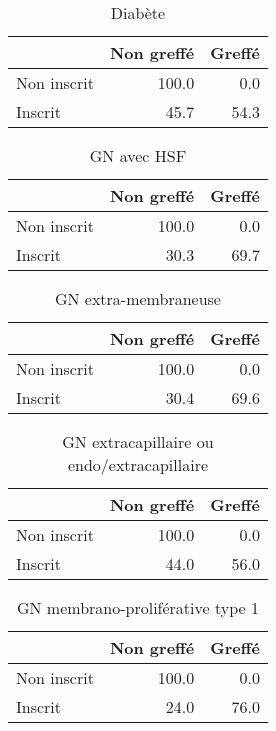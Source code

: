 \documentclass[11pt,a4paper]{article}\usepackage[]{graphicx}\usepackage[]{color}
\begin{document}
\begin{table}[H]
\centering
\begin{tabular}{lrr}
  \hline
 & Non greffé & Greffé \\ 
  \hline
Non inscrit & 100.0 & 0.0 \\ 
  Inscrit & 45.7 & 54.3 \\ 
   \hline
\end{tabular}
\caption{Diabète} 
\end{table}
\begin{table}[H]
\centering
\begin{tabular}{lrr}
  \hline
 & Non greffé & Greffé \\ 
  \hline
Non inscrit & 100.0 & 0.0 \\ 
  Inscrit & 30.3 & 69.7 \\ 
   \hline
\end{tabular}
\caption{GN avec HSF} 
\end{table}
\begin{table}[H]
\centering
\begin{tabular}{lrr}
  \hline
 & Non greffé & Greffé \\ 
  \hline
Non inscrit & 100.0 & 0.0 \\ 
  Inscrit & 30.4 & 69.6 \\ 
   \hline
\end{tabular}
\caption{GN extra-membraneuse} 
\end{table}
\begin{table}[H]
\centering
\begin{tabular}{lrr}
  \hline
 & Non greffé & Greffé \\ 
  \hline
Non inscrit & 100.0 & 0.0 \\ 
  Inscrit & 44.0 & 56.0 \\ 
   \hline
\end{tabular}
\caption{GN extracapillaire ou endo/extracapillaire} 
\end{table}
\begin{table}[H]
\centering
\begin{tabular}{lrr}
  \hline
 & Non greffé & Greffé \\ 
  \hline
Non inscrit & 100.0 & 0.0 \\ 
  Inscrit & 24.0 & 76.0 \\ 
   \hline
\end{tabular}
\caption{GN membrano-proliférative type 1} 
\end{table}
\end{document}

